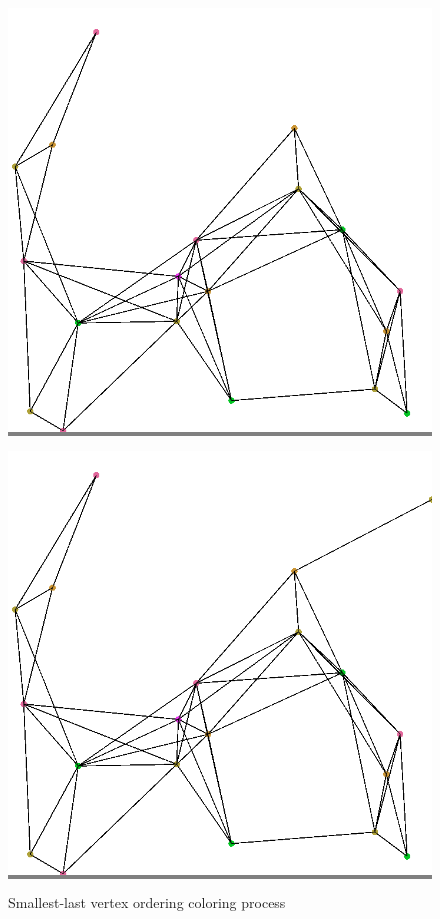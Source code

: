 \documentclass{article}
\begin{document}
\begin{figure}
\begin{minipage}{0.2\textwidth}
            \end{minipage}
            \hspace{\fill}
            \begin{minipage}{0.2\textwidth}
            \colorbox{gray}{\includegraphics[width=\linewidth]{./images/color-19.png}}
            \end{minipage}
            \hspace{\fill}
            \begin{minipage}{0.2\textwidth}
            \colorbox{gray}{\includegraphics[width=\linewidth]{./images/color-20.png}}
            \end{minipage}

            \caption{Smallest-last vertex ordering coloring process}
            \label{slvocolor}
        \end{figure}
\end{document}
